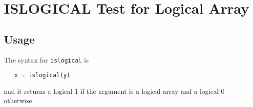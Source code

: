 \section{ISLOGICAL Test for Logical Array}

\subsection{Usage}

The syntax for \verb|islogical| is 
\begin{verbatim}
   x = islogical(y)
\end{verbatim}
and it returns a logical 1 if the argument is a logical array
and a logical 0 otherwise.
